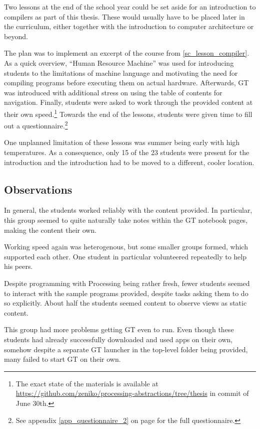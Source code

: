 Two lessons at the end of the school year could be set aside for an introduction to compilers as part of this thesis. These would usually have to be placed later in the curriculum, either together with the introduction to computer architecture or beyond.

The plan was to implement an excerpt of the course from \ref{sc_lesson_compiler}. As a quick overview, ``Human Resource Machine'' was used for introducing students to the limitations of machine language and motivating the need for compiling programs before executing them on actual hardware. Afterwards, \ac{GT} was introduced with additional stress on using the table of contents for navigation. Finally, students were asked to work through the provided content at their own speed.\footnote{The exact state of the materials is available at \url{https://github.com/zeniko/processing-abstractions/tree/thesis} in commit  of June 30th.} Towards the end of the lessons, students were given time to fill out a questionnaire.\footnote{See appendix \ref{app_questionnaire_2} on page \pageref{app_questionnaire_2} for the full questionnaire.}

One unplanned limitation of these lessons was summer being early with high temperatures. As a consequence, only 15 of the 23 students were present for the introduction and the introduction had to be moved to a different, cooler location.


\subsection{Observations}

In general, the students worked reliably with the content provided. In particular, this group seemed to quite naturally take notes within the \ac{GT} notebook pages, making the content their own.

Working speed again was heterogenous, but some smaller groups formed, which supported each other. One student in particular volunteered repeatedly to help his peers.

Despite programming with Processing being rather fresh, fewer students seemed to interact with the sample programs provided, despite tasks asking them to do so explicitly. About half the students seemed content to observe views as static content.

This group had more problems getting \ac{GT} even to run. Even though these students had already successfully downloaded and used apps on their own, somehow despite a separate \ac{GT} launcher in the top-level folder being provided, many failed to start \ac{GT} on their own.

